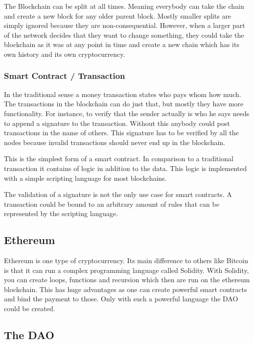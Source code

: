 \documentclass[a4paper, 11pt]{scrartcl}
\begin{document}
The Blockchain can be split at all times.
Meaning everybody can take the chain and create a new block for any older parent block.
Mostly smaller splits are simply ignored because they are non-consequential.
However, when a larger part of the network decides that they want to change something, they could take the blockchain as it was at any point in time and create a new chain which has its own history and its own cryptocurrency. \cite{blockchainKai}

\subsubsection{Smart Contract / Transaction}

In the traditional sense a money transaction states who pays whom how much.
The transactions in the blockchain can do just that, but mostly they have more functionality.
For instance, to verify that the sender actually is who he says needs to append a signature to the transaction.
Without this anybody could post transactions in the name of others.
This signature has to be verified by all the nodes because invalid transactions should never end up in the blockchain. \cite{blockchainKai}

This is the simplest form of a smart contract.
In comparison to a traditional transaction it contains of logic in addition to the data.
This logic is implemented with a simple scripting language for most blockchains. \cite{blockchainKai}

The validation of a signature is not the only use case for smart contracts.
A transaction could be bound to an arbitrary amount of rules that can be represented by the scripting language. \cite{blockchainKai}

\subsection{Ethereum}

Ethereum is one type of cryptocurrency.
Its main difference to others like Bitcoin is that it can run a complex programming language called Solidity.
With Solidity, you can create loops, functions and recursion which then are run on the ethereum blockchain.
This has huge advantages as one can create powerful smart contracts and bind the payment to those.
Only with such a powerful language the DAO could be created. \cite{eth}

\subsection{The DAO}
\end{document}
